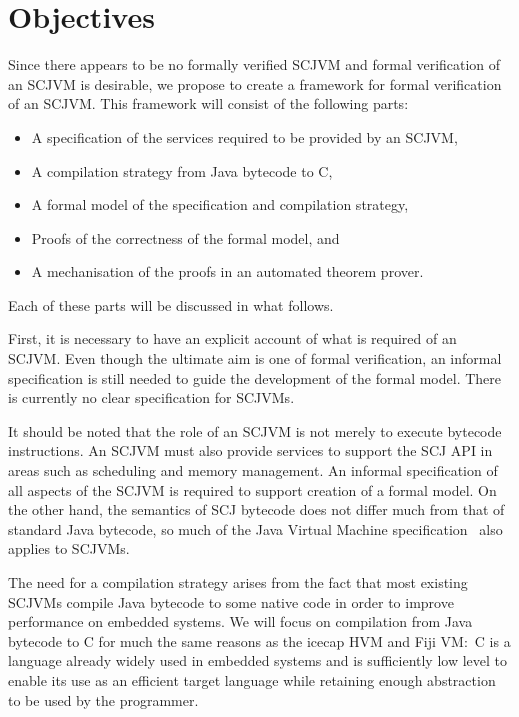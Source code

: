 \documentclass[a4paper,10pt]{report}
\begin{document}
\section{Objectives}
\label{objectives-section}

Since there appears to be no formally verified SCJVM and formal
verification of an SCJVM is desirable, we propose to create a
framework for formal verification of an SCJVM.
This framework will consist of the following parts:
\begin{itemize}
\item A specification of the services required to be provided by an
  SCJVM,
\item A compilation strategy from Java bytecode to C,
\item A formal model of the specification and compilation strategy,
\item Proofs of the correctness of the formal model, and
\item A mechanisation of the proofs in an automated theorem prover.
\end{itemize}
Each of these parts will be discussed in what follows.

First, it is necessary to have an explicit account of what is required
of an SCJVM.
Even though the ultimate aim is one of formal verification, an
informal specification is still needed to guide the development of the
formal model.
There is currently no clear specification for SCJVMs.

It should be noted that the role of an SCJVM is not merely to execute
bytecode instructions.
An SCJVM must also provide services to support the SCJ API in areas
such as scheduling and memory management.
An informal specification of all aspects of the SCJVM is required to
support creation of a formal model.
On the other hand, the semantics of SCJ bytecode does not differ much
from that of standard Java bytecode, so much of the Java Virtual
Machine specification~\cite{lindholm2014} also applies to SCJVMs.

The need for a compilation strategy arises from the fact that most
existing SCJVMs compile Java bytecode to some native code in order to
improve performance on embedded systems.
We will focus on compilation from Java bytecode to C for much the same
reasons as the icecap HVM and Fiji VM:~C is a language already widely
used in embedded systems and is sufficiently low level to enable its
use as an efficient target language while retaining enough abstraction
to be used by the programmer.
\end{document}
